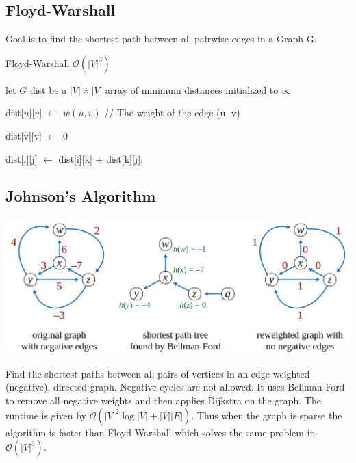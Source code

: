 \documentclass[9pt,landscape,a4paper, table]{extarticle}
\begin{document}
\begin{multicols*}{3}
\subsection{Floyd-Warshall}

Goal is to find the shortest path between all pairwise edges in a Graph G.

{\scriptsize
\begin{algorithm}[H]
    \caption{Floyd-Warshall $\mathcal{O}(|V|^3) $}
    
    \SetAlgoLined
    
    
    let $G$ dist be a $|V| × |V|$ array of minimum distances initialized to $\infty$
    
    
{
    dist[$u$][$v$] $\leftarrow$ $w(u, v)$  // The weight of the edge (u, v)
}

{
    dist[v][v] $\leftarrow$ 0
}

{
     {
         { 
             { 
                dist[i][j] $\leftarrow$ dist[i][k] + dist[k][j];
                
            }
        }
    }
}
\end{algorithm}}



\subsection{Johnson's Algorithm}

\begin{center}
    \includegraphics[width=0.7\linewidth]{img/1080px-Johnson's_algorithm.svg.png}
\end{center}
\vspace{-0.2cm}

Find the shortest paths between all pairs of vertices in an edge-weighted (negative), directed graph. Negative cycles are not allowed. It uses Bellman-Ford to remove all negative weights and then applies Dijkstra on the graph. The runtime is given by $\mathcal{O}(|V|^{2}\log |V|+|V||E|)$. Thus when the graph is sparse the algorithm is faster than Floyd-Warshall which solves the same problem in $\mathcal{O}(|V|
^3)$. 


\end{multicols*}
\end{document}
